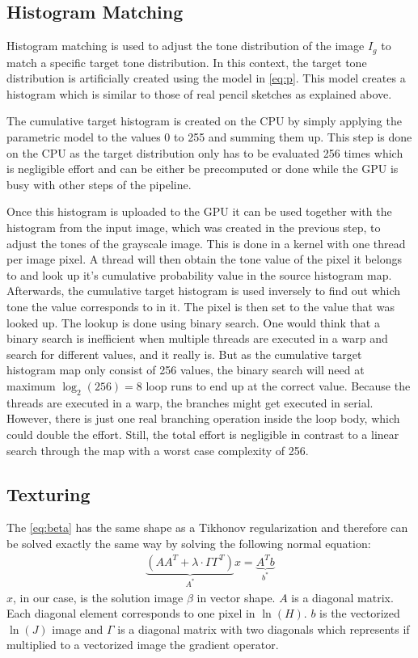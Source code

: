 \subsection{Histogram Matching}
Histogram matching is used to adjust the tone distribution of the 
image $I_g$ to match a specific target tone distribution. In this context, the
target tone distribution is artificially created using the model in
\autoref{eq:p}. This model creates a histogram which is similar to those of real
pencil sketches as explained above.

The cumulative target histogram is created on the CPU by simply applying
the parametric model to the values 0 to 255 and summing them up. This step is done
on the CPU as the target distribution only has to be evaluated 256 times which
is negligible effort and can be either be precomputed or done while the GPU is
busy with other steps of the pipeline.

Once this histogram is uploaded to the GPU it can be used together with
the histogram from the input image, which was created in the previous step, to
adjust the tones of the grayscale image. This is done in a kernel with one
thread per image pixel. A thread will then obtain the tone value of the pixel it
belongs to and look up it's cumulative probability value in the source histogram
map.  Afterwards, the cumulative target histogram is used inversely to find out
which tone the value corresponds to in it. The pixel is then set to the value
that was looked up. The lookup is done using binary search.
One would think that a binary search is inefficient when multiple threads
are executed in a warp and search for different values, and it really is.
But as the cumulative target histogram map only consist of 256 values,
the binary search will need at maximum $\log_2(256)=8$ loop runs to end
up at the correct value. Because the threads are executed in a warp,
the branches might get executed in serial. However, there is just one 
real branching operation inside the loop body, which could double the
effort. Still, the total effort is negligible in contrast to a linear search
through the map with a worst case complexity of 256.

\subsection{Texturing}
The \autoref{eq:beta} has the same shape as a Tikhonov regularization and
therefore can be solved exactly the same way by solving the following normal
equation:
\begin{align}
  \underbrace{(A A^T + \lambda \cdot \Gamma \Gamma^T)}_{A^*} x = \underbrace{A^T
  b}_{b^*}
  \label{eq:tikhonov}
\end{align}
$x$, in our case, is the solution image $\beta$ in vector shape. $A$ is a diagonal matrix.
Each diagonal element corresponds to one pixel in $\ln(H)$. $b$ is the
vectorized $\ln(J)$ image and $\Gamma$ is a diagonal matrix with two diagonals
which represents if multiplied to a vectorized image the gradient operator.

